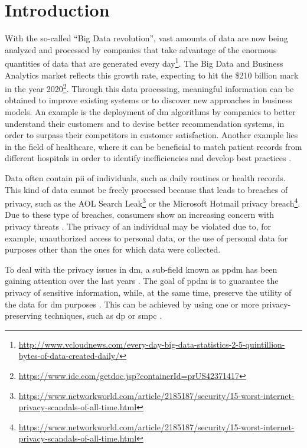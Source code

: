 %

\acresetall

\chapter{Introduction}
\label{ch:Introduction}



With the so-called ``Big Data revolution'', vast amounts of data are now being analyzed and processed by companies that take advantage of the enormous quantities of data that are generated every day\footnote{\url{http://www.vcloudnews.com/every-day-big-data-statistics-2-5-quintillion-bytes-of-data-created-daily/}}. The Big Data and Business Analytics market reflects this growth rate, expecting to hit the \$210 billion mark in the year 2020\footnote{\url{https://www.idc.com/getdoc.jsp?containerId=prUS42371417}}.
Through this data processing, meaningful information can be obtained to improve existing systems or to discover new approaches in business models. An example is the deployment of \ac{dm} algorithms by companies to better understand their customers and to devise better recommendation systems, in order to surpass their competitors in customer satisfaction. Another example lies in the field of healthcare, where it can be beneficial to match patient records from different hospitals in order to identify inefficiencies and develop best practices \cite{Lu2014}. 

Data often contain \ac{pii} of individuals, such as daily routines or health records. This kind of data cannot be freely processed because that leads to breaches of privacy, such as the AOL Search Leak\footnote{\url{https://www.networkworld.com/article/2185187/security/15-worst-internet-privacy-scandals-of-all-time.html}} or the Microsoft Hotmail privacy breach\footnote{\url{https://www.networkworld.com/article/2185187/security/15-worst-internet-privacy-scandals-of-all-time.html}}. Due to these type of breaches, consumers show an increasing concern with privacy threats \cite{brankovic1999privacy}. The privacy of an individual may be violated due to, for example, unauthorized access to personal data, or the use of personal data for purposes other than the ones for which data were collected.

To deal with the privacy issues in \ac{dm}, a sub-field known as \ac{ppdm} has been gaining attention over the last years \cite{DAcquisto2015}. The goal of \ac{ppdm} is to guarantee the privacy of sensitive information, while, at the same time, preserve the utility of the data for \ac{dm} purposes \cite{agrawal2000privacy}.
This can be achieved by using one or more privacy-preserving techniques, such as \ac{dp} \cite{Danezis2015} or \ac{smpc} \cite{DAcquisto2015}.


